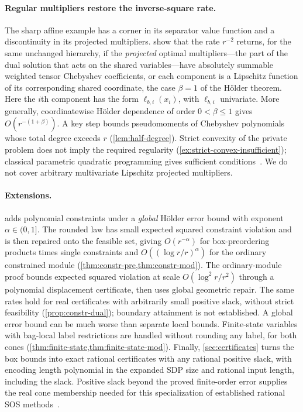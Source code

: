 \paragraph{Regular multipliers restore the inverse-square rate.}
The sharp affine example has a corner in its separator value function and
a discontinuity in its projected multipliers.
 show that the rate $r^{-2}$ returns, for
the same unchanged hierarchy, if the \emph{projected} optimal multipliers---the
part of the dual solution that acts on the shared variables---have
absolutely summable
weighted tensor Chebyshev coefficients, or each component is a Lipschitz
function of its corresponding shared coordinate, the case $\beta=1$ of
the Hölder theorem. Here the $i$th component has the form
$\ell_{b,i}(x_i)$, with $\ell_{b,i}$ univariate.
More generally, coordinatewise Hölder dependence of order
$0<\beta\le1$ gives $O(r^{-(1+\beta)})$. A key step bounds pseudomoments
of Chebyshev polynomials whose total degree exceeds $r$ (\cref{lem:half-degree}). Strict
convexity of the private problem does not imply the required regularity
(\cref{ex:strict-convex-insufficient}); classical parametric quadratic
programming gives sufficient
conditions~\cite{tondel2003-an-algorithm-for-multi-parametric,baotic2016-gradient-value-function}. We do not
cover arbitrary multivariate Lipschitz projected multipliers.

\paragraph{Extensions.}
 adds polynomial constraints under a \emph{global}
Hölder error bound with exponent $\alpha\in(0,1]$. The rounded law has small
expected squared constraint violation and is then repaired onto the feasible
set, giving $O(r^{-\alpha})$ for box-preordering products times single
constraints and $O((\log r/r)^\alpha)$ for the ordinary constrained module
(\cref{thm:constr-pre,thm:constr-mod}). The ordinary-module proof bounds
expected squared violation at scale $O(\log^2r/r^2)$ through a
polynomial displacement certificate, then uses global geometric repair.
The same rates hold for real certificates with arbitrarily small positive
slack, without strict feasibility (\cref{prop:constr-dual}); boundary
attainment is not established. A global error bound can be much worse than
separate local bounds. Finite-state variables with bag-local label restrictions are handled without rounding
any label, for both cones (\cref{thm:finite-state,thm:finite-state-mod}).
Finally, \cref{sec:certificates} turns the box bounds into exact rational
certificates with any rational positive slack, with encoding length
polynomial in the expanded SDP size and rational input length, including
the slack. Positive slack beyond the
proved finite-order error supplies the real cone membership needed for this
specialization of established rational SOS
methods~\cite{peyrl2008-computing-sum-of-squares-decompositions,davis2024-rational-dual-certificates-for-weighted}.

